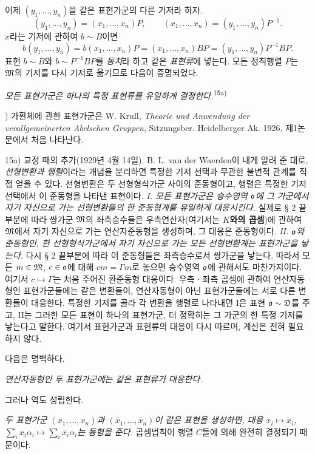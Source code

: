 이제 \((y_1,\ldots,y_n)\)을 같은 표현가군의 다른 기저라 하자.
\[
        (y_1,\ldots,y_n)=(x_1,\ldots,x_n)P,
        \qquad
        (x_1,\ldots,x_n)=(y_1,\ldots,y_n)P^{-1}.
\]
\(x\)라는 기저에 관하여 \(b\sim B\)이면
\[
        b(y_1,\ldots,y_n)=b(x_1,\ldots,x_n)P
        =(x_1,\ldots,x_n)BP
        =(y_1,\ldots,y_n)P^{-1}BP.
\]
표현 \(b\sim B\)와 \(b\sim P^{-1}BP\)를 \emph{동치}라 하고 같은 \emph{표현류}에 넣는다. 모든 정칙행렬 \(P\)는 \(\mathfrak M\)의 기저를 다시 기저로 옮기므로 다음이 증명되었다.

\emph{모든 표현가군은 하나의 특정 표현류를 유일하게 결정한다.}\textsuperscript{15a)}

{\footnotesize{}) 가환체에 관한 표현가군은 W. Krull, \emph{Theorie und Anwendung der verallgemeinerten Abelschen Gruppen}, Sitzungsber. Heidelberger Ak. 1926, 제1논문에서 처음 나타난다.\par
15a) 교정 때의 추가(1929년 4월 14일). B. L. van der Waerden이 내게 알려 준 대로, \emph{선형변환과 행렬}이라는 개념을 분리하면 특정한 기저 선택과 무관한 불변적 관계를 직접 얻을 수 있다. 선형변환은 두 선형형식가군 사이의 준동형이고, 행렬은 특정한 기저 선택에서 이 준동형을 나타낸 표현이다. \emph{I. 모든 표현가군은 승수영역 \(\mathfrak o\)에 그 가군에서 자기 자신으로 가는 선형변환들의 한 준동형계를 유일하게 대응시킨다.} 실제로 § 2 끝부분에 따라 쌍가군 \(\mathfrak M\)의 좌측승수들은 우측연산자(여기서는 \textbf{\(K\)와의 곱셈})에 관하여 \(\mathfrak M\)에서 자기 자신으로 가는 연산자준동형을 생성하며, 그 대응은 준동형이다. \emph{II. \(\mathfrak o\)와 준동형인, 한 선형형식가군에서 자기 자신으로 가는 모든 선형변환계는 표현가군을 낳는다.} 다시 § 2 끝부분에 따라 이 준동형들은 좌측승수로서 쌍가군을 낳는다. 따라서 모든 \(m\in\mathfrak M\), \(c\in\mathfrak o\)에 대해 \(cm=\Gamma m\)로 놓으면 승수영역 \(\mathfrak o\)에 관해서도 마찬가지이다. 여기서 \(c\mapsto\Gamma\)는 처음 주어진 환준동형 대응이다. 우측ㆍ좌측 곱셈에 관하여 연산자동형인 표현가군들에는 같은 변환들이, 연산자동형이 아닌 표현가군들에는 서로 다른 변환들이 대응한다. 특정한 기저를 골라 각 변환을 행렬로 나타내면 I은 표현 \(\mathfrak o\sim\mathfrak D\)를 주고, II는 그러한 모든 표현이 하나의 표현가군, 더 정확히는 그 가군의 한 특정 기저를 낳는다고 말한다. 여기서 표현가군과 표현류의 대응이 다시 따르며, 계산은 전혀 필요하지 않다.\par}

다음은 명백하다.

\emph{연산자동형인 두 표현가군에는 같은 표현류가 대응한다.}

그러나 역도 성립한다.

\emph{두 표현가군 \((x_1,\ldots,x_n)\)과 \((\bar x_1,\ldots,\bar x_n)\)이 같은 표현을 생성하면, 대응 \(x_i\mapsto\bar x_i\), \(\sum_i x_i\alpha_i\mapsto\sum_i\bar x_i\alpha_i\)는 동형을 준다.} 곱셈법칙이 행렬 \(C\)들에 의해 완전히 결정되기 때문이다.

